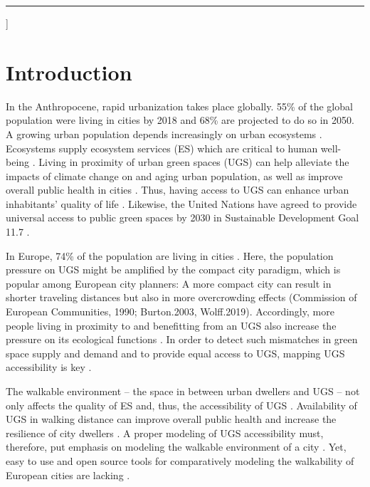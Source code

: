 \documentclass[10pt]{article}
\begin{document}
\vspace*{.5cm}

\hrule

\par\vspace{2ex}]

\vspace{.5cm}

\normalsize


\section{Introduction}
In the Anthropocene, rapid urbanization takes place globally. 55\% of the global population were living in cities by 2018 and 68\% are projected to do so in 2050.
A growing urban population depends increasingly on urban ecosystems \citep{Elmqvist.2021, UN.2019}.
Ecosystems supply ecosystem services (ES) which are critical to human well-being \citep{Fisher.2009}.
Living in proximity of urban green spaces (UGS) can help alleviate the impacts of climate change on and aging urban population, as well as improve overall public health in cities \citep{Kabisch.2021, Kabisch.2021b}.
Thus, having access to UGS can enhance urban inhabitants’ quality of life \citep{Poelman.2018}.
Likewise, the United Nations have agreed to provide universal access to public green spaces by 2030 in Sustainable Development Goal 11.7 \citep{UN.2017}.

In Europe, 74\% of the population are living in cities \citep{UN.2019}.
Here, the population pressure on UGS might be amplified by the compact city paradigm, which is popular among European city planners: A more compact city can result in shorter traveling distances but also in more overcrowding effects (Commission of European Communities, 1990; Burton.2003, Wolff.2019).
Accordingly, more people living in proximity to and benefitting from an UGS also increase the pressure on its ecological functions \citep{Wolff.2019}.
In order to detect such mismatches in green space supply and demand and to provide equal access to UGS, mapping UGS accessibility is key \citep{Larondelle.2013}.

The walkable environment – the space in between urban dwellers and UGS – not only affects the quality of ES and, thus, the accessibility of UGS \citep{Syrbe.2012}.
Availability of UGS in walking distance can improve overall public health and increase the resilience of city dwellers \citep{Kabisch.2021,Richardson.2013}.
A proper modeling of UGS accessibility must, therefore, put emphasis on modeling the walkable environment of a city \citep{Wolff.2019}.
Yet, easy to use and open source tools for comparatively modeling the walkability of European cities are lacking \citep{Kabisch.2016}.
\end{document}
